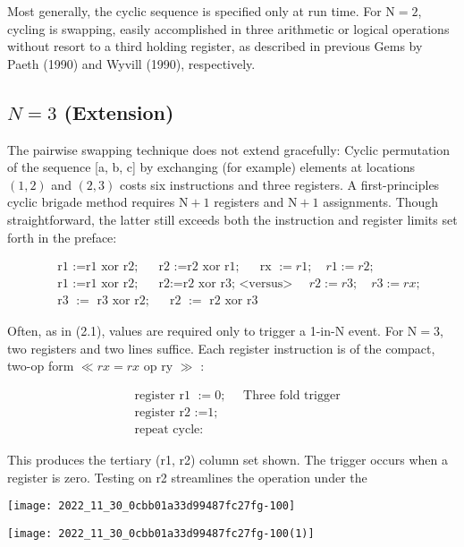 \begin{CJK}{UTF8}{gbsn}
Most generally, the cyclic sequence is specified only at run time. For $\mathrm{N}=2$, cycling is swapping, easily accomplished in three arithmetic or logical operations without resort to a third holding register, as described in previous Gems by Paeth (1990) and Wyvill (1990), respectively.

\subsection*{$N=3$ (Extension)}
The pairwise swapping technique does not extend gracefully: Cyclic permutation of the sequence [a, b, c] by exchanging (for example) elements at locations $(1,2)$ and $(2,3)$ costs six instructions and three registers. A first-principles cyclic brigade method requires $\mathrm{N}+1$ registers and $\mathrm{N}+1$ assignments. Though straightforward, the latter still exceeds both the instruction and register limits set forth in the preface:

$$
\begin{aligned}
& \text { r1 :=r1 xor r2; } \quad \text { r2 :=r2 xor r1; } \quad \text { rx }:=r 1 ; \quad r 1:=r 2 \text {; } \\
& \text { r1 :=r1 xor r2; } \quad \text { r2:=r2 xor r3; <versus> } \quad r 2:=r 3 ; \quad r 3:=r x ; \\
& \text { r3 }:=\text { r3 xor r2; } \quad \text { r2 }:=\text { r2 xor r3 }
\end{aligned}
$$

Often, as in (2.1), values are required only to trigger a 1-in-N event. For $\mathrm{N}=3$, two registers and two lines suffice. Each register instruction is of the compact, two-op form $\ll r x=r x$ op ry $\gg$ :

$$
\begin{aligned}
& \text { register r1 }:=0 ; \quad \text { Three fold trigger } \\
& \text { register r2 :=1; } \\
& \text { repeat cycle: }
\end{aligned}
$$

This produces the tertiary (r1, r2) column set shown. The trigger occurs when a register is zero. Testing on r2 streamlines the operation under the

\begin{center}
\texttt{[image: 2022\_11\_30\_0cbb01a33d99487fc27fg-100]}
\end{center}

\begin{center}
\texttt{[image: 2022\_11\_30\_0cbb01a33d99487fc27fg-100(1)]}
\end{center}


\end{CJK}
